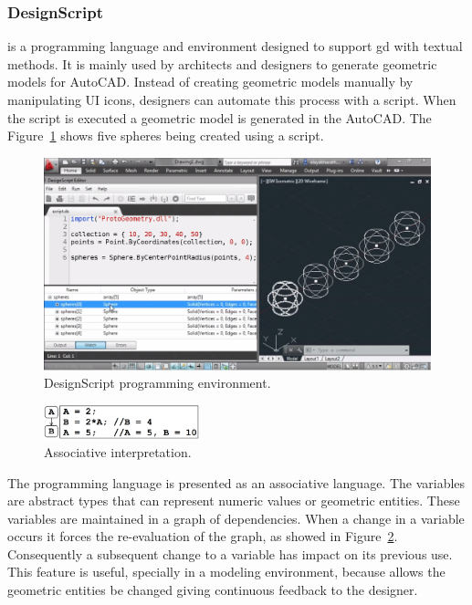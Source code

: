 \subsubsection{DesignScript~\cite{aish2012designscript}} is a programming language and environment designed to support \ac{gd} with textual methods. It is mainly used by architects and designers to generate geometric models for AutoCAD. Instead of creating geometric models manually by manipulating UI icons, designers can automate this process with a script. When the script is executed a geometric model is generated in the AutoCAD. The Figure~\ref{fig:ds} shows five spheres being created using a script.

\begin{figure}[!htbp]
  \centering
  \includegraphics[width=1.0\textwidth]{img/designScriptIDE}
    \caption{DesignScript programming environment.}  
  \label{fig:ds}
\end{figure} 


\begin{figure}
  \vspace{-25pt}
  \begin{center}
    \includegraphics[width=0.4\textwidth]{img/designscript}
  \end{center}
  \vspace{-20pt}
 \caption{Associative interpretation.}  
  \vspace{-20pt}
    \label{fig:designscript}
\end{figure}
The programming language is presented as an associative language. The variables are abstract types that can represent numeric values or geometric entities. These variables are maintained in a graph of dependencies. When a change in a variable occurs it forces the re-evaluation of the graph, as showed in Figure~\ref{fig:designscript}. Consequently a subsequent change to a variable has impact on its previous use. This feature is useful, specially in a modeling environment, because allows the geometric entities be changed giving continuous feedback to the designer.

